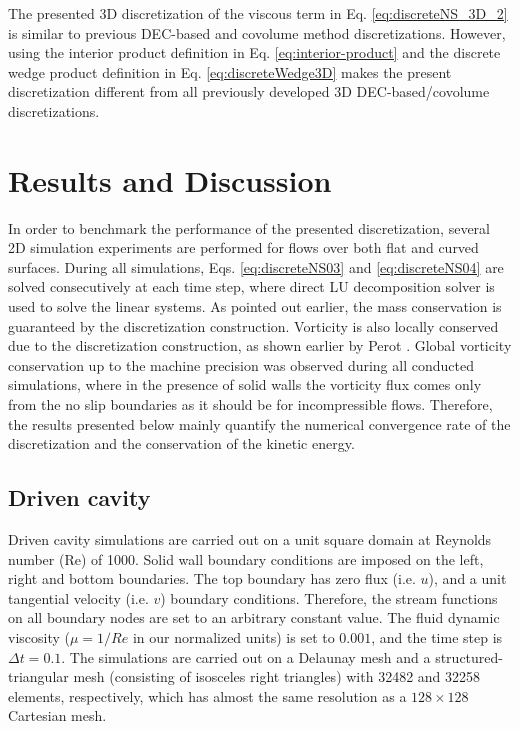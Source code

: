 \documentclass[final,12pt,times]{elsarticle}
\begin{document}
 
The presented 3D discretization of the viscous term in Eq. \eqref{eq:discreteNS_3D_2} is similar to previous DEC-based \cite{elcott2007stable,mullen2009energy} and covolume method \cite{cavendish1994complementary,zhang2002accuracy} discretizations. However, using the interior product definition in Eq. \eqref{eq:interior-product} and the discrete wedge product definition in Eq. \eqref{eq:discreteWedge3D} makes the present discretization different from all previously developed 3D DEC-based/covolume discretizations.           
 
\section{Results and Discussion}
\label{sec:results}

In order to benchmark the performance of the presented discretization, several 2D simulation experiments are performed for flows over both flat and curved surfaces. During all simulations, Eqs. \eqref{eq:discreteNS03} and \eqref{eq:discreteNS04} are solved consecutively at each time step, where direct LU decomposition solver is used to solve the linear systems. As pointed out earlier, the mass conservation is guaranteed by the discretization construction. Vorticity is also locally conserved due to the discretization construction, as shown earlier by Perot \cite{perot2000conservation}. Global vorticity conservation up to the machine precision was observed during all conducted simulations, where in the presence of solid walls the vorticity flux comes only from the no slip boundaries as it should be for incompressible flows. Therefore, the results presented below mainly quantify the numerical convergence rate of the discretization and the conservation of the kinetic energy.
        

\subsection{Driven cavity}
\label{subsec:Driven-cavity}
Driven cavity simulations are carried out on a unit square domain at Reynolds number (Re) of 1000. Solid wall boundary conditions are imposed on the left, right and bottom boundaries. The top boundary has zero flux (i.e. $u$), and a unit tangential velocity (i.e. $v$) boundary conditions. Therefore, the stream functions on all boundary nodes are set to an arbitrary constant value. The fluid dynamic viscosity ($\mu = 1/Re$ in our normalized units) is set to $0.001$, and the time step is $\Delta t = 0.1$. The simulations are carried out on a Delaunay mesh and a structured-triangular mesh (consisting of isosceles right triangles) with 32482 and 32258 elements, respectively, which has almost the same resolution as a $128 \times 128$ Cartesian mesh.
\end{document}
